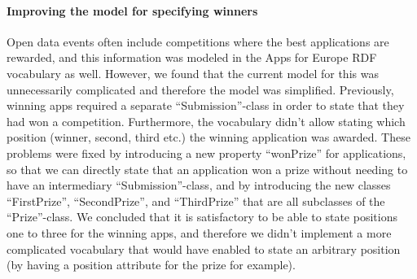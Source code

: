 \begin{figure}[!htbp]
\end{figure}

\paragraph{Improving the model for specifying winners}
Open data events often include competitions where the best applications are rewarded, and this information was modeled in the Apps for Europe RDF vocabulary as well. However, we found that the current model for this was unnecessarily complicated and therefore the model was simplified. Previously, winning apps required a separate ``Submission''-class in order to state that they had won a competition. Furthermore, the vocabulary didn't allow stating which position (winner, second, third etc.) the winning application was awarded. These problems were fixed by introducing a new property ``wonPrize'' for applications, so that we can directly state that an application won a prize without needing to have an intermediary ``Submission''-class, and by introducing the new classes ``FirstPrize'', ``SecondPrize'', and ``ThirdPrize'' that are all subclasses of the ``Prize''-class. We concluded that it is satisfactory to be able to state positions one to three for the winning apps, and therefore we didn't implement a more complicated vocabulary that would have enabled to state an arbitrary position (by having a position attribute for the prize for example).

